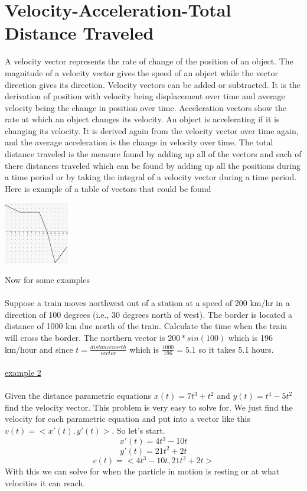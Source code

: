 \documentclass[a4paper,openright, 14pt]{article}
\begin{document}
\section*{Velocity-Acceleration-Total Distance Traveled}
A velocity vector represents the rate of change of the position of an object. The magnitude of a velocity vector gives the speed of an object while the vector direction gives its direction. Velocity vectors can be added or subtracted. It is the derivation of position with velocity being displacement over time and average velocity being the change in position over time. Acceleration vectors show the rate at which an object changes its velocity. An object is accelerating if it is changing its velocity. It is derived again from the velocity vector over time again, and the average acceleration is the change in velocity over time. The total distance traveled is the measure found by adding up all of the vectors and each of there distances traveled which can be found by adding up all the positions during a time period or by taking the integral of a velocity vector during a time period. Here is example of a table of vectors that could be found 
\begin{center}
\includegraphics[width = 7 cm, height = 5 cm]{vectors.png}
\end{center}
Now for some examples\\\\
Suppose a train moves northwest out of a station at a speed of 200 km/hr in a direction of 100 degrees (i.e., 30 degrees north of west). The border is located a distance of 1000 km due north of the train. Calculate the time when the train will cross the border. The northern vector is $200*sin(100)$ which is 196 km/hour and since $t=\frac{distance north}{vector}$ which is $\frac{1000}{196}=5.1$ so it takes 5.1 hours.\\\\
\underline{example 2}\\\\
Given the distance parametric equations $x(t)=7t^3+t^2$ and $y(t)=t^4-5t^2$ find the velocity vector. This problem is very easy to solve for. We just find the velocity for each parametric equation and put into a vector like this $v(t)=<x'(t),y'(t)>$. So let's start.
$$x'(t)=4t^3 -10t$$
$$y'(t)=21t^2 +2t$$
$$v(t)=<4t^3 -10t,21t^2 +2t>$$
With this we can solve for when the particle in motion is resting or at what velocities it can reach.
\end{document}
